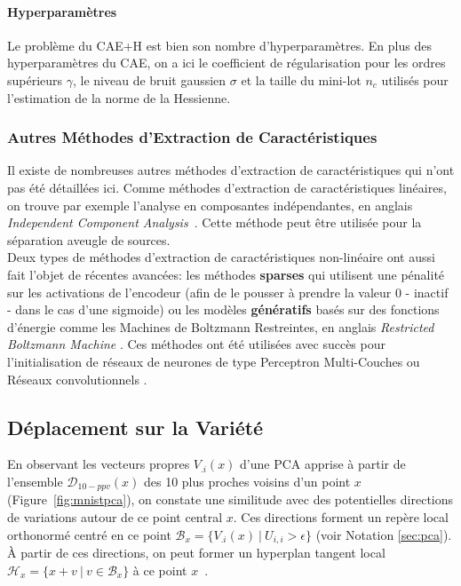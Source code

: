 \paragraph{Hyperparamètres} Le problème du CAE+H est bien son nombre
d'hyperparamètres. En plus des hyperparamètres du CAE, on a ici le coefficient
de régularisation pour les ordres supérieurs $\gamma$, le niveau de bruit
gaussien $\sigma$ et la taille du mini-lot $n_c$ utilisés pour l'estimation de
la norme de la Hessienne.

\subsubsection{Autres Méthodes d'Extraction de Caractéristiques}

Il existe de nombreuses autres méthodes d'extraction de caractéristiques qui
n'ont pas été détaillées ici. Comme méthodes d'extraction de caractéristiques
linéaires, on trouve par exemple l'analyse en composantes indépendantes, en
anglais \textit{Independent Component Analysis}~\citep{Comon94,Hyvarinen-2001}.
Cette méthode peut être utilisée pour la séparation aveugle de sources.  \\

Deux types de méthodes d'extraction de caractéristiques non-linéaire  ont aussi
fait l'objet de récentes avancées: les méthodes {\bf sparses}
\citep{ranzato-08,koray-psd-08,Koray-08} qui utilisent une pénalité sur les
activations de l'encodeur (afin de le pousser à prendre la valeur $0$ - inactif
- dans le cas d'une sigmoide)  ou les modèles {\bf génératifs} basés sur des
  fonctions d'énergie \citep{ranzato-unsup-07} comme les Machines de Boltzmann
  Restreintes, en anglais \textit{Restricted Boltzmann Machine}
  \citep{Tieleman08}.  Ces méthodes ont été utilisées avec succès pour
  l'initialisation de réseaux de neurones de type Perceptron Multi-Couches
  \citep{HintonG2006,ranzato-08,koray-psd-08,Koray-08} ou Réseaux
  convolutionnels \citep{koray-nips-10-small}. 

\subsection{Déplacement sur la Variété}
\label{sec:surfing}

En observant les vecteurs propres $V_{.i}(x)$ d'une PCA apprise à partir de
l'ensemble $\mathcal{D}_{10-ppv}(x)$ des 10 plus proches voisins d'un point $x$
(Figure~\ref{fig:mnistpca}), on constate une similitude avec des potentielles
directions de variations autour de ce point central $x$.  Ces directions
forment un repère local orthonormé centré en ce point $\mathcal{B}_{x}=\lbrace
V_{.i}(x)~|~U_{i,i} > \epsilon\rbrace$ (voir Notation \ref{sec:pca}). À partir
de ces directions, on peut former un hyperplan tangent local $\mathcal{H}_{x}=\lbrace
x + v~|~v\in\mathcal{B}_{x} \rbrace$ à ce point $x$~\citep{Dauphin-et-al-NIPS2011}.

